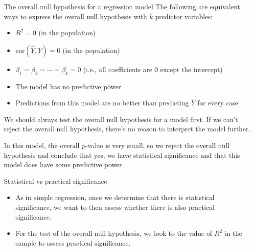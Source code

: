 \documentclass{beamer}\usepackage[]{graphicx}\usepackage[]{color}
\begin{document}
\begin{darkframes}
    \begin{frame}{The overall null hypothesis for a regression model}
      The following are equivalent ways to express the overall null hypothesis with $k$ predictor variables:
      \begin{itemize}[<+->]
        \item $R^2=0$ (in the population)
        \item $\text{cor}(\hat Y,Y)=0$ (in the population)
        \item $\beta_1=\beta_2=\cdots=\beta_k=0$ (i.e., all coefficients are 0 except the intercept)
        \item The model has no predictive power
        \item Predictions from this model are no better than predicting $\overline Y$ for every case
      \end{itemize}
    \end{frame}

    \begin{frame}
      We should always test the overall null hypothesis for a model first. \alert{If we can't reject the overall null hypothesis, there's no reason to interpret the model further.}

      \bigskip\pause

      In this model, the overall $p$-value is very small, so we reject the overall null hypothesis and conclude that yes, we have statistical significance and that this model does have some predictive power.
    \end{frame}

    \begin{frame}{Statistical vs practical significance}
      \begin{itemize}
        \item As in simple regression, once we determine that there is statistical significance, we want to then assess whether there is also practical significance.
        \item For the test of the overall null hypothesis, we look to the value of $R^2$ in the sample to assess practical significance.
      \end{itemize}
    \end{frame}


\end{darkframes}
\end{document}
